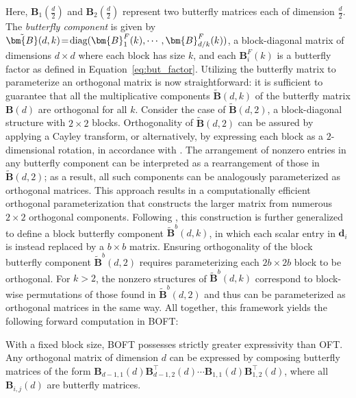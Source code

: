 Here, $\bm{B}_1(\frac{d}{2})$ and $\bm{B}_2(\frac{d}{2})$ represent two butterfly matrices each of dimension $\frac{d}{2}$. The \emph{butterfly component} is given by $\thickmuskip=2mu \medmuskip=2mu \tilde{\bm{B}}(d,k)=\text{diag}(\bm{B}^F_1(k),\cdots,\bm{B}^F_{d/k}(k))$, a block-diagonal matrix of dimensions $d\times d$ where each block has size $k$, and each $\bm{B}^F_i(k)$ is a butterfly factor as defined in Equation~\ref{eq:but_factor}. Utilizing the butterfly matrix to parameterize an orthogonal matrix is now straightforward: it is sufficient to guarantee that all the multiplicative components $\tilde{\bm{B}}(d,k)$ of the butterfly matrix $\bm{B}(d)$ are orthogonal for all $k$. Consider the case of $\tilde{\bm{B}}(d,2)$, a block-diagonal structure with $2\times 2$ blocks. Orthogonality of $\tilde{\bm{B}}(d,2)$ can be assured by applying a Cayley transform, or alternatively, by expressing each block as a $2$-dimensional rotation, in accordance with \cite{liu2021orthogonal,qiu2023controlling}. The arrangement of nonzero entries in any butterfly component can be interpreted as a rearrangement of those in $\tilde{\bm{B}}(d,2)$; as a result, all such components can be analogously parameterized as orthogonal matrices. This approach results in a computationally efficient orthogonal parameterization that constructs the larger matrix from numerous $2\times 2$ orthogonal components. Following \cite{chen2022pixelated}, this construction is further generalized to define a block butterfly component $\tilde{\bm{B}}^b(d,k)$, in which each scalar entry in $\bm{d}_i$ is instead replaced by a $b\times b$ matrix. Ensuring orthogonality of the block butterfly component $\tilde{\bm{B}}^b(d,2)$ requires parameterizing each $2b\times 2b$ block to be orthogonal. For $k>2$, the nonzero structures of $\tilde{\bm{B}}^b(d,k)$ correspond to block-wise permutations of those found in $\tilde{\bm{B}}^b(d,2)$ and thus can be parameterized as orthogonal matrices in the same way. All together, this framework yields the following forward computation in BOFT:

\begin{theorem}\label{thm:exp_boft}
    With a fixed block size, BOFT possesses strictly greater expressivity than OFT. Any orthogonal matrix of dimension $d$ can be expressed by composing butterfly matrices of the form $\bm{B}_{d-1,1}(d)\bm{B}^\top_{d-1,2}(d)\cdots\bm{B}_{1,1}(d)\bm{B}^\top_{1,2}(d)$, where all $\bm{B}_{i,j}(d)$ are butterfly matrices.
\end{theorem}

